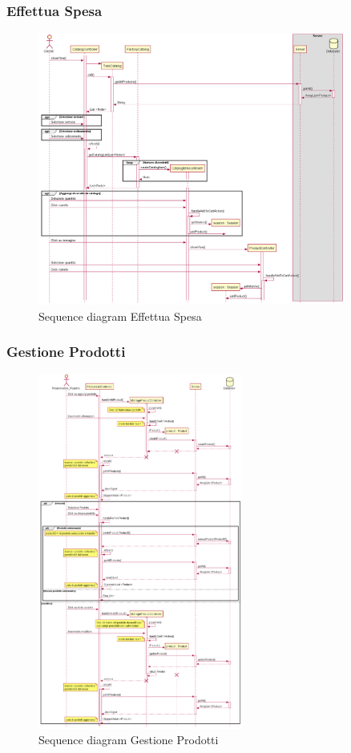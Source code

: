 \documentclass[12pt, a4paper]{report}
\begin{document}
\newpage

\subsubsection{Effettua Spesa}

\begin{figure}[ht]
  \centering
  \includegraphics[width=0.9\textwidth]{sequence_effettua_spesa.png}
  \caption{Sequence diagram Effettua Spesa}
\end{figure}

\newpage

\subsubsection{Gestione Prodotti}

\begin{figure}[ht]
  \centering
  \includegraphics[width=0.6\textwidth]{sequence_gestione_prodotto.png}
  \caption{Sequence diagram Gestione Prodotti}
\end{figure}
\end{document}
